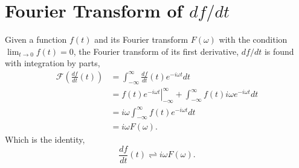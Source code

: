 \documentclass[12pt,twocolumn]{article}
\begin{document}
\section{Fourier Transform of $df/dt$}
\label{ap:fourier2}
Given a function $f(t)$ and its Fourier transform $F(\omega)$ with the condition $\lim_{t\rightarrow 0}f(t) = 0$, the Fourier transform of its first derivative, $df/dt$ is found with integration by parts,
\begin{align*}
\mathcal{F}\left(\frac{df}{dt}(t)\right) &= \int_{-\infty}^{\infty}\frac{df}{dt}(t)e^{-i\omega t}dt \\
& = \left.f(t)e^{-i\omega t}\right|_{-\infty}^{\infty} + \int_{-\infty}^{\infty}f(t)i\omega e^{-i\omega t}dt\\
& = i\omega \int_{-\infty}^{\infty}f(t)e^{-i\omega t}dt\\
& = i\omega F(\omega).
\end{align*}
Which is the identity,
\begin{equation}
\frac{df}{dt}(t) \rightleftharpoons i\omega F(\omega).
\end{equation}

\newpage
\end{document}
